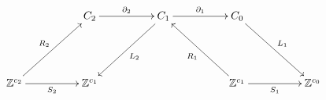 \documentclass{standalone}
\newcommand{\ZZ}{\mathbb{Z}}
\begin{document}
\Large
\(\displaystyle
\xymatrix@C+24pt@R+24pt{
& C_2  \ar[r]^{\partial_ 2} 
& C_1 \ar[r]^{\partial_ 1} \ar[dl]^{L_2}
& C_0  \ar[dr]^{L_1}  
\\
 \ZZ^{c_2} \ar[ur]^{R_2} \ar[r]_{S_2} &\ZZ^{c_1} &  & \ZZ^{c_1} \ar[r]_{S_1}
\ar[ul]^{R_1} &  \ZZ^{c_0} 
}
\)
\end{document}
